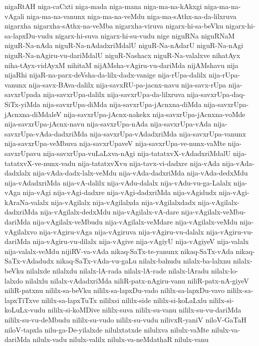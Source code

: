 {nigaRtAH
niga-caCxti
niga-mada
niga-mana
niga-ma-na-kAkxgi
niga-ma-na-vAgali
niga-ma-na-vanunx
niga-ma-na-veMdu
niga-ma-sAthx-na-da-lilxruva
nigarxha
nigarxha-sAthx-na-veMba
nigarxha-viruva
nigarx-hi-sa-beVku
nigarx-hi-sa-lapxDu-vudu
nigarx-hi-suva
nigarx-hi-su-vudu
nige
niguRNa
niguRNaM
niguR-Na-nAda
niguR-Na-nAdadxriMdalU
niguR-Na-nAdarU
niguR-Na-nAgi
niguR-Na-nAgiru-vu-dariMdalU
niguR-Nashacx
niguR-Na-valalxve
nihatAyx
niha-tAyx-vidAyxM
nihitaM
nijAMsha-vAgiru-vu-dariMda
nijAMshavu
nija
nijaRhi
nijaR-na-parx-deVsha-da-lilx-dadx-vanige
nija-rUpa-dalilx
nija-rUpa-vanunx
nija-savx-BAva-dalilx
nija-savxRU-pa-jacnx-navu
nija-savx-rUpa
nija-savxrUpada
nija-savxrUpa-dalilx
nija-savxrUpa-da-lilxruva
nija-savxrUpa-daq-SiTx-yiMda
nija-savxrUpa-diMda
nija-savxrUpa-jAcnxna-diMda
nija-savxrUpa-jAcnxna-diMdaleV
nija-savxrUpa-jAcnx-nakekx
nija-savxrUpa-jAcnxna-voMde
nija-savxrUpa-jAcnx-navu
nija-savxrUpa-nAda
nija-savxrUpa-vAda
nija-savxrUpa-vAda-dadxriMda
nija-savxrUpa-vAdadxriMda
nija-savxrUpa-vanunx
nija-savxrUpa-veMbuva
nija-savxrUpaveV
nija-savxrUpa-ve-nunx-vaMte
nija-savxrUpavu
nija-savxrUpa-vuLaLxva-nAgi
nija-tatatxvX-vAdadxriMdalU
nija-tatatxvX-ve-nunx-vadu
nija-tatatxvXvu
nija-tavx-vi-dadxre
nija-vAda
nija-vAda-dadxlalx
nija-vAda-dadx-lalx-veMdu
nija-vAda-dadxriMda
nija-vAda-dedxMdu
nija-vAdadxriMda
nija-vA-dalilx
nija-vAdu-dalalx
nija-vAdu-vu-ga-Lalalx
nija-vAga
nija-vAgi
nija-vAgi-dadxre
nija-vAgi-dadxriMda
nija-vAgidudx
nija-vAgi-kAraNa-valalx
nija-vAgilalx
nija-vAgilalxda
nija-vAgilalxdadx
nija-vAgilalx-dadxriMda
nija-vAgilalx-dedxMdu
nija-vAgilalx-vA-dare
nija-vAgilalx-veMbu-dariMda
nija-vAgilalx-veMbudu
nija-vAgilalx-veMdare
nija-vAgilalx-veMdu
nija-vAgilalxvo
nija-vAgiru-vAga
nija-vAgiruva
nija-vAgiru-vu-dalalx
nija-vAgiru-vu-dariMda
nija-vAgiru-vu-dilalx
nija-vAgive
nija-vAgiyU
nija-vAgiyeV
nija-valalx
nija-valalx-veMdu
nijiRV-va-vAda
nikaq-SaTx-te-yanunx
nikaq-SaTx-vAda
nikaq-SaTx-vAdadudx
nikaq-SaTx-vAda-vu-gaLu
nilalx-bahudu
nilalx-ba-lalxnu
nilalx-beVku
nilalxde
nilalxdu
nilalx-lA-rada
nilalx-lA-rade
nilalx-lAradu
nilalx-lo-lalxdo
nilalxlu
nilalx-vAdadxriMda
niliR-patx-nAgiru-vanu
niliR-patx-nA-giyeV
niliR-patxnu
nililx-sa-beVku
nililx-sa-lapxDu-vado
nililx-sa-lapxDu-vavo
nililx-sa-lapxTiTxve
nililx-sa-lapxTuTx
nililxsi
nililx-side
nililx-si-koLaLxlu
nililx-si-koLuLx-vudu
nililx-si-koMDive
nililx-suva
nililx-su-vanu
nililx-su-vu-dariMda
nililx-su-vu-deMbudu
nililx-su-vudo
nililx-su-vudu
nilivxR-yaniV
niloV-GaTaH
niloV-tapxla
nilu-ga-De-yilalxde
nilulxtatxde
nilulxva
nilulx-vaMte
nilulx-va-dariMda
nilulx-vadu
nilulx-valilx
nilulx-va-neMdathaR
nilulx-vanu
}
